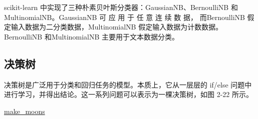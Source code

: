 scikit-learn 中实现了三种朴素贝叶斯分类器：GaussianNB、BernoulliNB 和 MultinomialNB。GaussianNB 可 应 用 于 任 意 连 续 数 据， 而BernoulliNB 假定输入数据为二分类数据，MultinomialNB 假定输入数据为计数数据。BernoulliNB 和MultinomialNB 主要用于文本数据分类。

\subsection{决策树}
决策树是广泛用于分类和回归任务的模型。本质上，它从一层层的 if/else 问题中进行学习，并得出结论。这一系列问题可以表示为一棵决策树，如图 2-22 所示。

\href{https://scikit-learn.org/stable/modules/generated/sklearn.datasets.make_moons.html}{make\_moons}